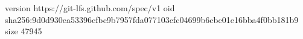 version https://git-lfs.github.com/spec/v1
oid sha256:9d0d930ea53396cfbc9b7957fda077103cfc04699b6cbc01e16bba4f0bb181b9
size 47945
